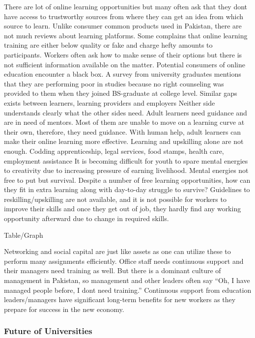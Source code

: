 \documentclass[]{elsarticle} %
\begin{document}
There are lot of online learning opportunities but many often ask that
they dont have access to trustworthy sources from where they can get an
idea from which source to learn. Unlike consumer common products used in
Pakistan, there are not much reviews about learning platforms. Some
complains that online learning training are either below quality or fake
and charge hefty amounts to participants. Workers often ask how to make
sense of their options but there is not sufficient information available
on the matter. Potential consumers of online education encounter a black
box. A survey from university graduates mentions that they are
performing poor in studies because no right counseling was provided to
them when they joined BS-graduate at college level. Similar gaps exists
between learners, learning providers and employers Neither side
understands clearly what the other sides need. Adult learners need
guidance and are in need of mentors. Most of them are unable to move on
a learning curve at their own, therefore, they need guidance. With human
help, adult learners can make their online learning more effective.
Learning and upskilling alone are not enough. Codding apprenticeship,
legal services, food stamps, health care, employment assistance It is
becoming difficult for youth to spare mental energies to creativity due
to increasing pressure of earning livelihood. Mental energies not free
to put but survival. Despite a number of free learning opportunities,
how can they fit in extra learning along with day-to-day struggle to
survive? Guidelines to reskilling/upskilling are not available, and it
is not possible for workers to improve their skills and once they get
out of job, they hardly find any working opportunity afterward due to
change in required skills.

Table/Graph

Networking and social capital are just like assets as one can utilize
these to perform many assignments efficiently. Office staff needs
continuous support and their managers need training as well. But there
is a dominant culture of management in Pakistan, so management and other
leaders often say ``Oh, I have managed people before, I dont need
training.'' Continuous support from education leaders/managers have
significant long-term benefits for new workers as they prepare for
success in the new economy.

\hypertarget{future-of-universities}{%
\subsubsection{Future of Universities}\label{future-of-universities}}
\end{document}

